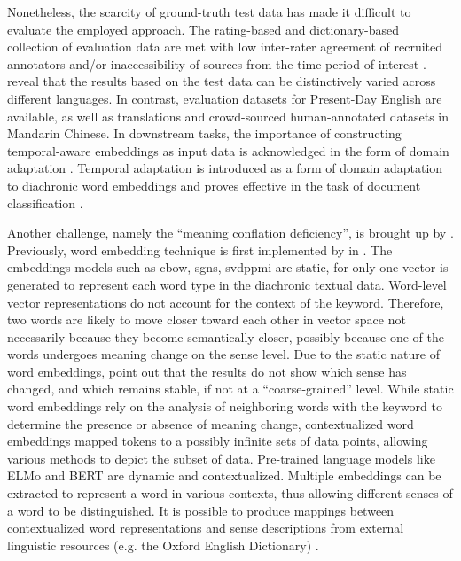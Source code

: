 Nonetheless, the scarcity of ground-truth test data has made it difficult to evaluate the employed approach. The rating-based and dictionary-based collection of evaluation data are met with low inter-rater agreement of recruited annotators and/or inaccessibility of sources from the time period of interest \parencite{tang2018state}. \textcite{kutuzov2020uio} reveal that the results based on the test data can be distinctively varied across different languages. In contrast, evaluation datasets for Present-Day English are available, as well as translations and crowd-sourced human-annotated datasets in Mandarin Chinese. In downstream tasks, the importance of constructing temporal-aware embeddings as input data is acknowledged in the form of domain adaptation \parencite{huang2019neural}. Temporal adaptation is introduced as a form of domain adaptation to diachronic word embeddings and proves effective in the task of document classification \parencite{huang2019neural}.  %

Another challenge, namely the ``meaning conflation deficiency'', is brought up by \textcite{camacho2018survey}. Previously, word embedding technique is first implemented by \citeauthor{mikolov2013efficient} in \citeyear{mikolov2013efficient}. The embeddings models such as \gls{cbow}, \gls{sgns}, \gls{svdppmi} are static, for only one vector is generated to represent each word type in the diachronic textual data. Word-level vector representations do not account for the context of the keyword. Therefore, two words are likely to move closer toward each other in vector space not necessarily because they become semantically closer, possibly because one of the words undergoes meaning change on the sense level. Due to the static nature of word embeddings, \textcite{hu2019diachronic} point out that the results do not show which sense has changed, and which remains stable, if not at a ``coarse-grained'' level. While static word embeddings rely on the analysis of neighboring words with the keyword to determine the presence or absence of meaning change, contextualized word embeddings mapped tokens to a possibly infinite sets of data points, allowing various methods to depict the subset of data. Pre-trained language models like ELMo and BERT are dynamic and contextualized. Multiple embeddings can be extracted to represent a word in various contexts, thus allowing different senses of a word to be distinguished. It is possible to produce mappings between contextualized word representations and sense descriptions from external linguistic resources (e.g. the Oxford English Dictionary) \parencite{hu2019diachronic}.

